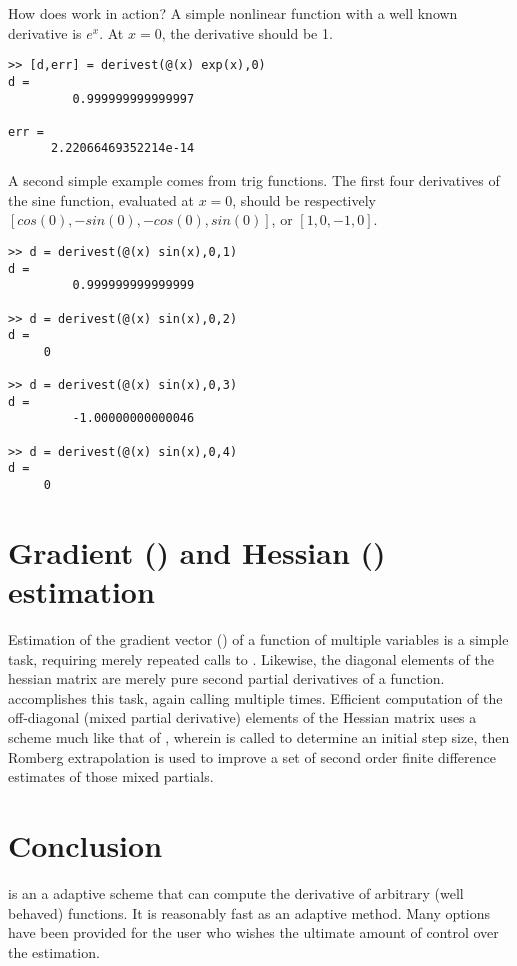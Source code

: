 \documentclass[a4paper,11pt]{article}
\begin{document}
How does  work in action? A simple nonlinear function with a well
known derivative is $e^x$. At $x = 0$, the derivative should be 1.

\begin{lstlisting}
>> [d,err] = derivest(@(x) exp(x),0)
d =
         0.999999999999997

err =
      2.22066469352214e-14
\end{lstlisting}

A second simple example comes from trig functions. The first four derivatives of the sine
function, evaluated at $x = 0$, should be respectively $[cos(0), -sin(0), -cos(0), sin(0)]$,
or $[1,0,-1,0]$.

\begin{lstlisting}
>> d = derivest(@(x) sin(x),0,1)
d =
         0.999999999999999

>> d = derivest(@(x) sin(x),0,2)
d =
     0

>> d = derivest(@(x) sin(x),0,3)
d =
         -1.00000000000046

>> d = derivest(@(x) sin(x),0,4)
d =
     0
\end{lstlisting}


\bigskip

\section{Gradient () and Hessian () estimation}

Estimation of the gradient vector () of a function of multiple variables is a
simple task, requiring merely repeated calls to . Likewise, the diagonal
elements of the hessian matrix are merely pure second partial derivatives of a function.
 accomplishes this task, again calling  multiple
times. Efficient computation of the off-diagonal (mixed partial derivative) elements of the
Hessian matrix uses a scheme much like that of , wherein
 is called to determine an initial step size, then Romberg extrapolation
is used to improve a set of second order finite difference estimates of those mixed partials.

\bigskip

\section{Conclusion}

 is an a adaptive scheme that can compute the derivative of arbitrary
(well behaved) functions. It is reasonably fast as an adaptive method. Many options have
been provided for the user who wishes the ultimate amount of control over the estimation.
\end{document}
